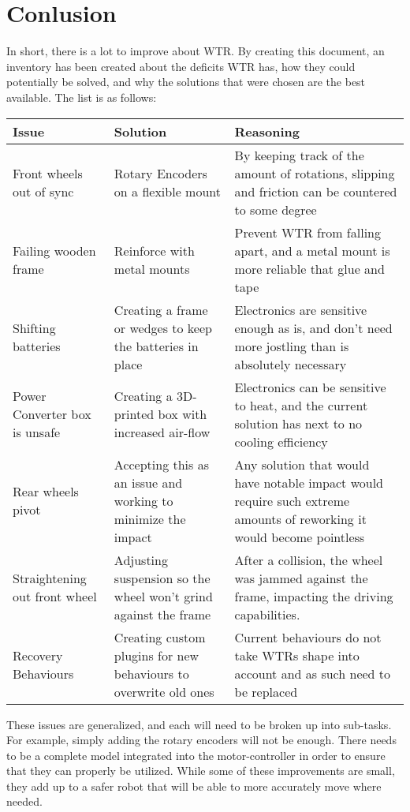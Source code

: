 \section{Conlusion}
In short, there is a lot to improve about WTR.
By creating this document, an inventory has been created about the deficits WTR has, how they could potentially be solved, and why the solutions that were chosen are the best available.
The list is as follows:

\begin{tabular}{|C{3cm}|L{6cm}|L{6cm}|}
\hline
\textbf{Issue}                 &\textbf{Solution} & \textbf{Reasoning} \\ \hline
Front wheels out of sync       &Rotary Encoders on a flexible mount    & By keeping track of the amount of rotations, slipping and friction can be countered to some degree \\ \hline
Failing wooden frame           & Reinforce with metal mounts    & Prevent WTR from falling apart, and a metal mount is more reliable that glue and tape \\ \hline
Shifting batteries    & Creating a frame or wedges to keep the batteries in place & Electronics are sensitive enough as is, and don't need more jostling than is absolutely necessary \\ \hline
Power Converter box is unsafe & Creating a 3D-printed box with increased air-flow & Electronics can be sensitive to heat, and the current solution has next to no cooling efficiency \\ \hline
Rear wheels pivot    & Accepting this as an issue and working to minimize the impact & Any solution that would have notable impact would require such extreme amounts of reworking it would become pointless \\ \hline
Straightening out front wheel & Adjusting suspension so the wheel won't grind against the frame & After a collision, the wheel was jammed against the frame, impacting the driving capabilities. \\ \hline
Recovery Behaviours & Creating custom plugins for new behaviours to overwrite old ones & Current behaviours do not take WTRs shape into account and as such need to be replaced \\ \hline
\end{tabular}
These issues are generalized, and each will need to be broken up into sub-tasks.
For example, simply adding the rotary encoders will not be enough.
There needs to be a complete model integrated into the motor-controller in order to ensure that they can properly be utilized.
While some of these improvements are small, they add up to a safer robot that will be able to more accurately move where needed.

\newpage